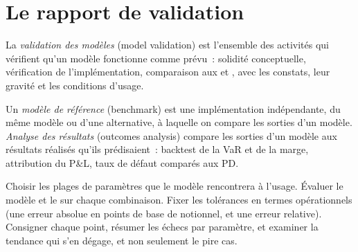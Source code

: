 \section{Le rapport de validation}

\begin{definition}\label{def:rc:model-risk-and-validation:validation}
La \emph{validation des modèles} (model validation) est l'ensemble des activités qui vérifient qu'un
modèle fonctionne comme prévu~: solidité conceptuelle, vérification de l'implémentation, comparaison aux  et , avec les constats, leur gravité et les conditions d'usage.
\end{definition}

\begin{definition}\label{def:rc:model-risk-and-validation:bench}
Un \emph{modèle de référence} (benchmark) est une implémentation indépendante, du même
modèle ou d'une alternative, à laquelle on compare les sorties d'un modèle. \emph{Analyse des
résultats} (outcomes analysis) compare les sorties d'un modèle aux résultats réalisés qu'ils
prédisaient~: backtest de la VaR et de la marge, attribution du P\&L, taux de défaut comparés aux PD.
\end{definition}

\begin{method}\label{met:rc:model-risk-and-validation:grid}
Choisir les plages de paramètres que le modèle rencontrera à l'usage. Évaluer le modèle et le  sur
chaque combinaison. Fixer les tolérances en termes opérationnels (une erreur absolue en points de base de notionnel,
et une erreur relative). Consigner chaque point, résumer les échecs par paramètre, et examiner la
tendance qui s'en dégage, et non seulement le pire cas.
\end{method}

\label{lst:rc:model-risk-and-validation:bench}

